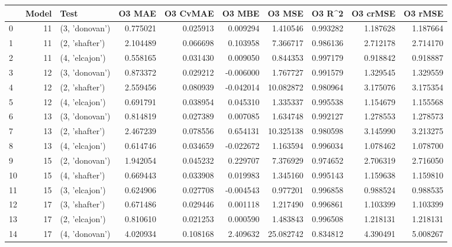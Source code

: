 \begin{tabular}{lrlrrrrrrr}
\toprule
{} &  Model &            Test &    O3 MAE &  O3 CvMAE &    O3 MBE &     O3 MSE &    O3 R\textasciicircum2 &  O3 crMSE &   O3 rMSE \\
\midrule
0  &     11 &  (3, 'donovan') &  0.775021 &  0.025913 &  0.009294 &   1.410546 &  0.993282 &  1.187628 &  1.187664 \\
1  &     11 &  (2, 'shafter') &  2.104489 &  0.066698 &  0.103958 &   7.366717 &  0.986136 &  2.712178 &  2.714170 \\
2  &     11 &  (4, 'elcajon') &  0.558165 &  0.031430 &  0.009050 &   0.844353 &  0.997179 &  0.918842 &  0.918887 \\
3  &     12 &  (3, 'donovan') &  0.873372 &  0.029212 & -0.006000 &   1.767727 &  0.991579 &  1.329545 &  1.329559 \\
4  &     12 &  (2, 'shafter') &  2.559456 &  0.080939 & -0.042014 &  10.082872 &  0.980964 &  3.175076 &  3.175354 \\
5  &     12 &  (4, 'elcajon') &  0.691791 &  0.038954 &  0.045310 &   1.335337 &  0.995538 &  1.154679 &  1.155568 \\
6  &     13 &  (3, 'donovan') &  0.814819 &  0.027389 &  0.007085 &   1.634748 &  0.992127 &  1.278553 &  1.278573 \\
7  &     13 &  (2, 'shafter') &  2.467239 &  0.078556 &  0.654131 &  10.325138 &  0.980598 &  3.145990 &  3.213275 \\
8  &     13 &  (4, 'elcajon') &  0.614746 &  0.034659 & -0.022672 &   1.163594 &  0.996034 &  1.078462 &  1.078700 \\
9  &     15 &  (2, 'donovan') &  1.942054 &  0.045232 &  0.229707 &   7.376929 &  0.974652 &  2.706319 &  2.716050 \\
10 &     15 &  (4, 'shafter') &  0.669443 &  0.033908 &  0.019983 &   1.345160 &  0.995143 &  1.159638 &  1.159810 \\
11 &     15 &  (3, 'elcajon') &  0.624906 &  0.027708 & -0.004543 &   0.977201 &  0.996858 &  0.988524 &  0.988535 \\
12 &     17 &  (3, 'shafter') &  0.671486 &  0.029446 &  0.001118 &   1.217490 &  0.996861 &  1.103399 &  1.103399 \\
13 &     17 &  (2, 'elcajon') &  0.810610 &  0.021253 &  0.000590 &   1.483843 &  0.996508 &  1.218131 &  1.218131 \\
14 &     17 &  (4, 'donovan') &  4.020934 &  0.108168 &  2.409632 &  25.082742 &  0.834812 &  4.390491 &  5.008267 \\

\end{tabular}
